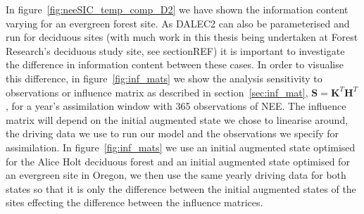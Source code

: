 \documentclass[11pt]{article}
\begin{document}
In figure~\ref{fig:neeSIC_temp_comp_D2} we have shown the information content varying for an evergreen forest site. As DALEC2 can also be parameterised and run for deciduous sites (with much work in this thesis being undertaken at Forest Research's deciduous study site, see section{\color{red}REF}) it is important to investigate the difference in information content between these cases. In order to visualise this difference, in figure~\ref{fig:inf_mats} we show the analysis sensitivity to observations or influence matrix \citep{Cardinali2004} as described in section~\ref{sec:inf_mat}, \(\textbf{S} = \textbf{K}^{T}\textbf{H}^{T}\), for a year's assimilation window with 365 observations of NEE. The influence matrix will depend on the initial augmented state we chose to linearise around, the driving data we use to run our model and the observations we specify for assimilation. In figure~\ref{fig:inf_mats} we use an initial augmented state optimised for the Alice Holt deciduous forest and an initial augmented state optimised for an evergreen site in Oregon, we then use the same yearly driving data for both states so that it is only the difference between the initial augmented states of the sites effecting the difference between the influence matrices.  
\end{document}
